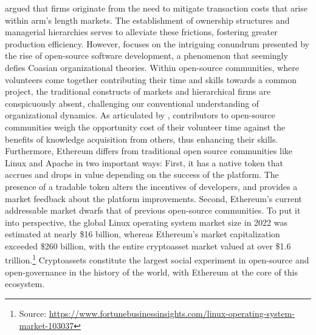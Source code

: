 \documentclass[No]{AEA}
\begin{document}
\cite{Coase1937} argued that firms originate from the need to mitigate transaction costs that arise within arm's length markets. The establishment of ownership structures and managerial hierarchies serves to alleviate these frictions, fostering greater production efficiency. However, \cite{Benkler2002} focuses on the intriguing conundrum presented by the rise of open-source software development, a phenomenon that seemingly defies Coasian organizational theories. Within open-source communities, where volunteers come together contributing their time and skills towards a common project, the traditional constructs of markets and hierarchical firms are conspicuously absent, challenging our conventional understanding of organizational dynamics. As articulated by \cite{LernerTirole2005}, contributors to open-source communities weigh the opportunity cost of their volunteer time against the benefits of knowledge acquisition from others, thus enhancing their skills. Furthermore, Ethereum differs from traditional open source communities like Linux and Apache in two important ways: First, it has a native token that accrues and drops in value depending on the success of the platform. The presence of a tradable token alters the incentives of developers, and provides a market feedback about the platform improvements. Second, Ethereum's current addressable market dwarfs that of previous open-source communities. To put it into perspective, the global Linux operating system market size in 2022 was estimated at nearly \$16 billion, whereas Ethereum's market capitalization exceeded \$260 billion, with the entire cryptoasset market valued at over \$1.6 trillion.\footnote{Source: \url{https://www.fortunebusinessinsights.com/linux-operating-system-market-103037}} Cryptoassets constitute the largest social experiment in open-source and open-governance in the history of the world, with Ethereum at the core of this ecosystem.
\end{document}
